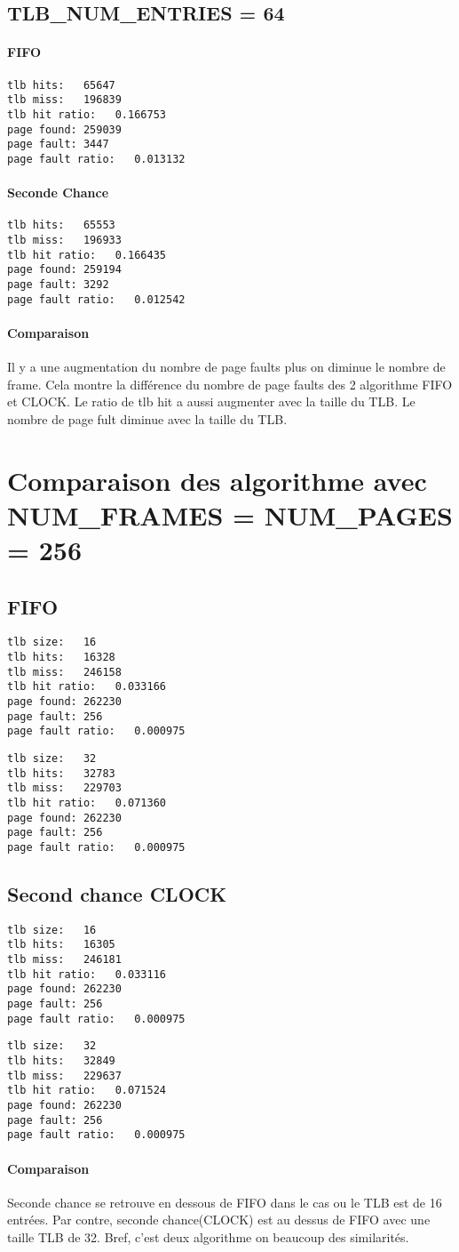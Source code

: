 \documentclass{article}
\begin{document}
\subsection*{TLB\_NUM\_ENTRIES = 64}
\paragraph{FIFO}
\begin{lstlisting}
tlb hits:   65647
tlb miss:   196839
tlb hit ratio:   0.166753
page found: 259039
page fault: 3447
page fault ratio:   0.013132
\end{lstlisting}

\paragraph{Seconde Chance}
\begin{lstlisting}
tlb hits:   65553
tlb miss:   196933
tlb hit ratio:   0.166435
page found: 259194
page fault: 3292
page fault ratio:   0.012542
\end{lstlisting}
\paragraph{Comparaison}
Il y a une augmentation du nombre de page faults plus on diminue le nombre de frame.
Cela montre la différence du nombre de page faults des 2 algorithme FIFO et CLOCK.
Le ratio de tlb hit a aussi augmenter avec la taille du TLB. Le nombre de page fult diminue
avec la taille du TLB. 

\section*{Comparaison des algorithme avec NUM\_FRAMES = NUM\_PAGES = 256}
\subsection*{FIFO}
\begin{lstlisting}
tlb size:   16
tlb hits:   16328
tlb miss:   246158
tlb hit ratio:   0.033166
page found: 262230
page fault: 256
page fault ratio:   0.000975
\end{lstlisting}
\begin{lstlisting}
tlb size:   32
tlb hits:   32783
tlb miss:   229703
tlb hit ratio:   0.071360
page found: 262230
page fault: 256
page fault ratio:   0.000975
\end{lstlisting}

\subsection*{Second chance CLOCK}
\begin{lstlisting}
tlb size:   16
tlb hits:   16305
tlb miss:   246181
tlb hit ratio:   0.033116
page found: 262230
page fault: 256
page fault ratio:   0.000975
\end{lstlisting}
\begin{lstlisting}
tlb size:   32
tlb hits:   32849
tlb miss:   229637
tlb hit ratio:   0.071524
page found: 262230
page fault: 256
page fault ratio:   0.000975
\end{lstlisting}
\paragraph{Comparaison}
Seconde chance se retrouve en dessous de FIFO dans le cas ou le TLB est de 16 entrées.
Par contre, seconde chance(CLOCK) est au dessus de FIFO avec une taille TLB de 32.
Bref, c'est deux algorithme on beaucoup des similarités.
\end{document}
